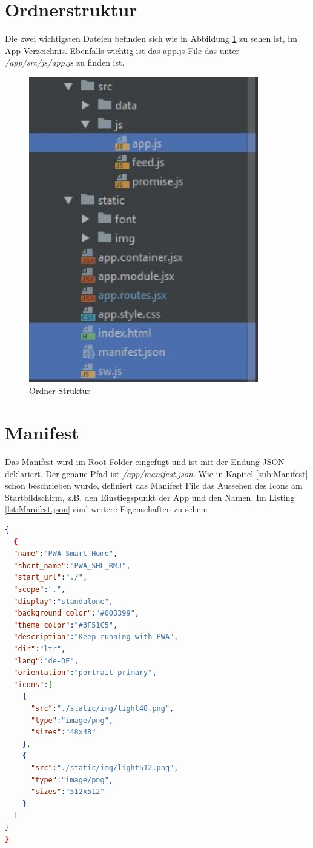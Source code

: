 \section{Ordnerstruktur}
Die zwei wichtigsten Dateien befinden sich wie in Abbildung \ref{fig:OrdnerStrucktur} zu sehen ist, im App Verzeichnis.
Ebenfalls wichtig ist das app.js File das unter \textit{/app/src/js/app.js} zu finden ist.

\begin{figure}[h]
	\centering
	\includegraphics[width=10cm]{BilderAllgemein/Implementierung/OrdnerStrucktur.jpg}\medskip
	\caption{Ordner Struktur}
	\label{fig:OrdnerStrucktur}
\end{figure} 

\newpage
\section{Manifest}
Das Manifest wird im Root Folder eingefügt und ist mit der Endung \acs{JSON} deklariert. Der genaue Pfad ist \textit{/app/manifest.json}. Wie in Kapitel \ref{sub:Manifest} schon beschrieben wurde, definiert das Manifest File das Aussehen des Icons am Startbildschirm, z.B. den Einstiegspunkt der App und den Namen.
Im Listing \ref{lst:Manifest.json} sind weitere Eigenschaften zu sehen:

\begin{lstlisting}[language=json, firstnumber=1, caption={Manifest in das Projekt implementieren},label=lst:Manifest.json, xleftmargin=50pt]
{
  {
  "name":"PWA Smart Home",
  "short_name":"PWA_SHL_RMJ",
  "start_url":"./",
  "scope":".",
  "display":"standalone",
  "background_color":"#003399",
  "theme_color":"#3F51C5",
  "description":"Keep running with PWA",
  "dir":"ltr",
  "lang":"de-DE",
  "orientation":"portrait-primary",
  "icons":[
    {
      "src":"./static/img/light48.png",
      "type":"image/png",
      "sizes":"48x48"
    },
    {
      "src":"./static/img/light512.png",
      "type":"image/png",
      "sizes":"512x512"
    }
  ]
}
}
\end{lstlisting}
\clearpage
